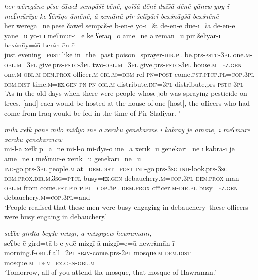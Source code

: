 \ea \label{BP.40}
\textit{her wēregāne pēse čāweɫ sempāšē bēnē, yoīšā dēnē duīšā dēnē yānew yoy ī meʕmūrīye ke ʕērāqo āmēnē, ā zemānū pīr šelīyārī bexšnāyšā bexšnēnē} \\ 
\gll her wēregā=ne pēse čāweɫ sempāš-ē b-ēn-ē yo-ī=šā de-ēn-ē duē-ī=šā de-ēn-ē yāne=ū yo-ī ī meʕmūr-ī=e ke ʕērāq=o āmē=nē ā zemān=ū pīr šelīyār-ī bexšnāy=šā bexšn-ēn-ē \\ 
 just evening\textsc{=\textsc{post}} like in\_the\_past poison\_sprayer\textsc{-dir}\textsc{.pl} be.prs\textsc{-pstc}\textsc{-3pl} one\textsc{.m}\textsc{-obl}\textsc{.m}\textsc{=3pl} give.prs\textsc{-pstc}\textsc{-3pl} two\textsc{-obl}\textsc{.m}\textsc{=3pl} give.prs\textsc{-pstc}\textsc{-3pl} house\textsc{.m}\textsc{=ez.gen} one\textsc{.m}\textsc{-obl}\textsc{.m} \textsc{dem.prox} officer\textsc{.m}\textsc{-obl}\textsc{.m}\textsc{=dem} rel \textsc{pn}\textsc{=\textsc{post}} come\textsc{.pst}\textsc{.ptcp}\textsc{.pl}\textsc{=cop}\textsc{.3pl} \textsc{dem.dist} time\textsc{.m}\textsc{=ez.gen} \textsc{pn} \textsc{pn}\textsc{-obl}\textsc{.m} distribute\textsc{.inf}\textsc{=3pl} distribute.prs\textsc{-pstc}\textsc{-3pl} \\ 
\glt `As in the old days when there were people whose job was spraying pesticide on trees, [and] each would be hosted at the house of one [host], the officers who had come from Iraq would be fed in the time of Pir Shaliyar. '
\z 
 
\ea \label{BP.45}
\textit{milā xeɫk pāne milo miđyo īne ā xerīkū genekārīnē ī kābrāy je āmēnē, ī meʕmūrē xerīkū genekārīnēw} \\ 
\gll mi-l-ā xeɫk p=ā=ne mi-l-o mi-đye-o īne=ā xerīk=ū genekārī=nē ī kābrā-ī je āmē=nē ī meʕmūr-ē xerīk=ū genekārī=nē=ū \\ 
 \textsc{ind-}go.prs\textsc{-3pl} people\textsc{.m} at=\textsc{dem.dist}\textsc{=\textsc{post}} \textsc{ind-}go.prs\textsc{-3sg} \textsc{ind-}look.prs\textsc{-3sg} \textsc{dem.prox}\textsc{.dir}\textsc{.m}\textsc{.3sg}=\textsc{ptcl} busy\textsc{=ez.gen} debauchery\textsc{.m}\textsc{=cop}\textsc{.3pl} \textsc{dem.prox} man\textsc{-obl}\textsc{.m} from come\textsc{.pst}\textsc{.ptcp}\textsc{.pl}\textsc{=cop}\textsc{.3pl} \textsc{dem.prox} officer\textsc{.m}\textsc{-dir}\textsc{.pl} busy\textsc{=ez.gen} debauchery\textsc{.m}\textsc{=cop}\textsc{.3pl}=and \\ 
\glt `People realised that these men were busy engaging in debauchery; these officers were busy engaing in debauchery.'
\z 
 
\ea \label{BP.54}
\textit{seʕbē girđtā beydē mizgī, ā mizgīyew hewrāmānī,} \\ 
\gll seʕbe-ē girđ=tā b-e-ydē mizgī ā mizgī=e=ū hewrāmān-ī \\ 
 morning.f\textsc{-obl}.f all=\textsc{2pl} \textsc{sbjv-}come.prs-\textsc{2pl} mosque\textsc{.m} \textsc{dem.dist} mosque\textsc{.m}\textsc{=dem}\textsc{=ez.gen}\textsc{-obl}\textsc{.m} \\ 
\glt `Tomorrow, all of you attend the mosque, that mosque of Hawraman.'
\z 
 
